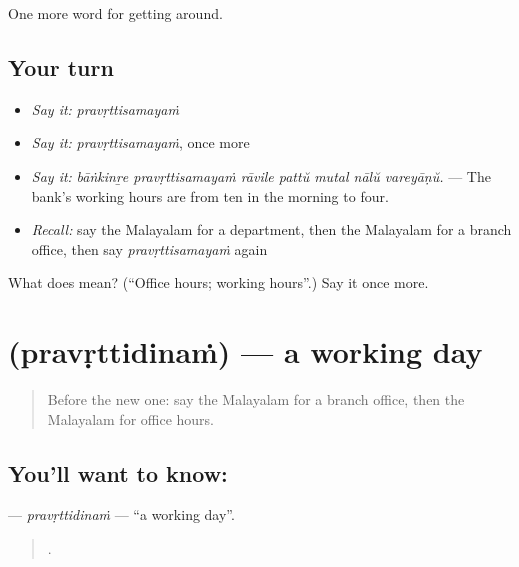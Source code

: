 \begin{grammarlens}[title={What you've built}]
One more word for getting around.
\end{grammarlens}

\subsection*{Your turn}
\begin{itemize}
\raggedright
  \item \emph{Say it:} \emph{pravṛttisamayaṁ}
  \item \emph{Say it:} \emph{pravṛttisamayaṁ}, once more
  \item \emph{Say it:} \emph{bāṅkinṟe pravṛttisamayaṁ rāvile pattŭ mutal nālŭ vareyāṇŭ.} — The bank's working hours are from ten in the morning to four.
  \item \emph{Recall:} say the Malayalam for a department, then the Malayalam for a branch office, then say \emph{pravṛttisamayaṁ} again
\end{itemize}

\begin{tcolorbox}[breakable,colback=teal!4,colframe=teal!35!black,title={Before you move on}]
What does  mean? (\textquotedblleft{}Office hours; working hours\textquotedblright{}.) Say it once more.
\end{tcolorbox}
\section[\texorpdfstring{\ml{പ്രവൃത്തിദിനം} (pravṛttidinaṁ)}{പ്രവൃത്തിദിനം (pravṛttidinaṁ)}]{ (pravṛttidinaṁ) — a working day}

\label{lesson:ML-C486-pravrttidinam}



\begin{quote}
Before the new one: say the Malayalam for a branch office, then the Malayalam for office hours.
\end{quote}

\subsection*{You'll want to know: }
\textbf{} — \emph{pravṛttidinaṁ} — \textquotedblleft{}a working day\textquotedblright{}.

\begin{quote}
  .
\end{quote}

